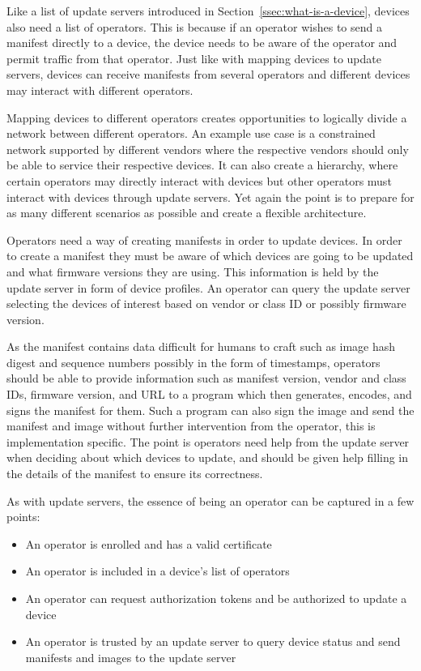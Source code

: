 \documentclass[0-thesis.tex]{subfiles}
\begin{document}
Like a list of update servers introduced in Section~\ref{ssec:what-is-a-device}, devices
also need a list of operators. This is because if an operator wishes to send a manifest
directly to a device, the device needs to be aware of the operator and permit traffic from
that operator. Just like with mapping devices to update servers, devices can receive
manifests from several operators and different devices may interact with different
operators. 

Mapping devices to different operators creates opportunities to logically divide a network
between different operators. An example use case is a constrained network supported by
different vendors where the respective vendors should only be able to service their
respective devices. It can also create a hierarchy, where certain operators may directly
interact with devices but other operators must interact with devices through update
servers. Yet again the point is to prepare for as many different scenarios as possible and
create a flexible architecture.

Operators need a way of creating manifests in order to update devices. In order to create
a manifest they must be aware of which devices are going to be updated and what firmware
versions they are using. This information is held by the update server in form of device
profiles. An operator can query the update server selecting the devices of interest based
on vendor or class ID or possibly firmware version. 

As the manifest contains data difficult for humans to craft such as image hash digest and
sequence numbers possibly in the form of timestamps, operators should be able to provide
information such as manifest version, vendor and class IDs, firmware version, and URL to a
program which then generates, encodes, and signs the manifest for them. Such a program can
also sign the image and send the manifest and image without further intervention from the
operator, this is implementation specific. The point is operators need help from the
update server when deciding about which devices to update, and should be given help
filling in the details of the manifest to ensure its correctness.

As with update servers, the essence of being an operator can be captured in a few points:

\begin{itemize}
    \item An operator is enrolled and has a valid certificate
    \item An operator is included in a device's list of operators
    \item An operator can request authorization tokens and be authorized to update a
            device
    \item An operator is trusted by an update server to query device status and send
            manifests and images to the update server
\end{itemize}
\end{document}
